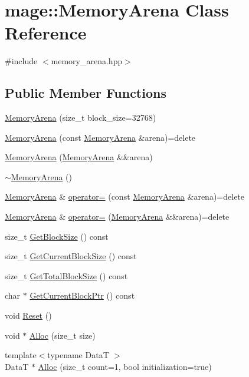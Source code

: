 \hypertarget{classmage_1_1_memory_arena}{}\section{mage\+:\+:Memory\+Arena Class Reference}
\label{classmage_1_1_memory_arena}


{\ttfamily \#include $<$memory\+\_\+arena.\+hpp$>$}

\subsection*{Public Member Functions}
\begin{DoxyCompactItemize}
\item 
\hyperlink{classmage_1_1_memory_arena_ac90beb8cf8dc42944a0fd6a4a9e8355c}{Memory\+Arena} (size\+\_\+t block\+\_\+size=32768)
\item 
\hyperlink{classmage_1_1_memory_arena_a1eca6fdacbd1226f4b21f443d118168b}{Memory\+Arena} (const \hyperlink{classmage_1_1_memory_arena}{Memory\+Arena} \&arena)=delete
\item 
\hyperlink{classmage_1_1_memory_arena_a98829c5a87ba028c376f100cca09e876}{Memory\+Arena} (\hyperlink{classmage_1_1_memory_arena}{Memory\+Arena} \&\&arena)
\item 
\hyperlink{classmage_1_1_memory_arena_acfee6fc205e2eaf6aeef4acf19948e6e}{$\sim$\+Memory\+Arena} ()
\item 
\hyperlink{classmage_1_1_memory_arena}{Memory\+Arena} \& \hyperlink{classmage_1_1_memory_arena_a7e7799f859c55435714933972ecb8b95}{operator=} (const \hyperlink{classmage_1_1_memory_arena}{Memory\+Arena} \&arena)=delete
\item 
\hyperlink{classmage_1_1_memory_arena}{Memory\+Arena} \& \hyperlink{classmage_1_1_memory_arena_aa4b80a917a838a1ca3788f906723d273}{operator=} (\hyperlink{classmage_1_1_memory_arena}{Memory\+Arena} \&\&arena)=delete
\item 
size\+\_\+t \hyperlink{classmage_1_1_memory_arena_a0db28bd286a517a30acdc061ace0bf56}{Get\+Block\+Size} () const
\item 
size\+\_\+t \hyperlink{classmage_1_1_memory_arena_a2789bf0c58dee881662bbb0c5ba73e55}{Get\+Current\+Block\+Size} () const
\item 
size\+\_\+t \hyperlink{classmage_1_1_memory_arena_ac4be7fb4d5623d6f78b1576c7884883a}{Get\+Total\+Block\+Size} () const
\item 
char $\ast$ \hyperlink{classmage_1_1_memory_arena_ac856206614ef9890d500df207d12e863}{Get\+Current\+Block\+Ptr} () const
\item 
void \hyperlink{classmage_1_1_memory_arena_a117b74c7bd5dfb28dfdaae6cab253491}{Reset} ()
\item 
void $\ast$ \hyperlink{classmage_1_1_memory_arena_a2e63b11c535dbfefd69d071466be9ce1}{Alloc} (size\+\_\+t size)
\item 
{\footnotesize template$<$typename DataT $>$ }\\DataT $\ast$ \hyperlink{classmage_1_1_memory_arena_a6797843db400848170d0b448a8a7e3b5}{Alloc} (size\+\_\+t count=1, bool initialization=true)
\end{DoxyCompactItemize}
